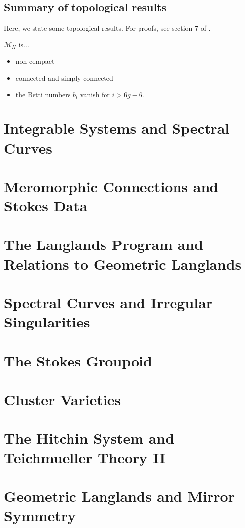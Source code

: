 \documentclass[oneside,english]{amsbook}
\numberwithin{section}{chapter}
\numberwithin{equation}{section}
\numberwithin{figure}{section}
\theoremstyle{plain}
\theoremstyle{definition}
\theoremstyle{remark}
\theoremstyle{definition}
\theoremstyle{definition}
\theoremstyle{plain}
\begin{document}
\section{Summary of topological results}

Here, we state some topological results. For proofs, see section 7
of \cite{H1}.

$\mathcal{M}_{H}$ is...
\begin{itemize}
\item non-compact
\item connected and simply connected
\item the Betti numbers $b_{i}$ vanish for $i>6g-6.$
\end{itemize}


\chapter{Integrable Systems and Spectral Curves}


\chapter{Meromorphic Connections and Stokes Data}


\chapter{The Langlands Program and Relations to Geometric Langlands}


\chapter{Spectral Curves and Irregular Singularities}


\chapter{The Stokes Groupoid}


\chapter{Cluster Varieties}


\chapter{The Hitchin System and Teichmueller Theory II}


\chapter{Geometric Langlands and Mirror Symmetry}
\end{document}
